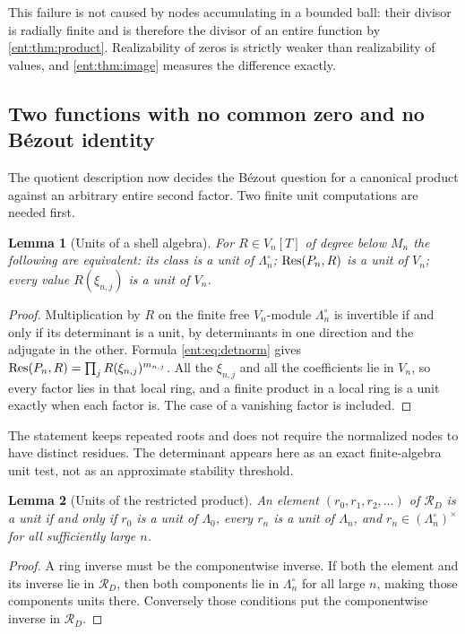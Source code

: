 \documentclass[11pt]{article}
\theoremstyle{plain}
\newtheorem{lemma}[lemma]{Lemma}
\theoremstyle{plain}
\theoremstyle{plain}
\theoremstyle{definition}
\theoremstyle{definition}
\theoremstyle{definition}
\theoremstyle{definition}
\theoremstyle{remark}
\newcommand{\RD}{\mathcal R_D}\newcommand{\Ucal}{\mathcal U}
\begin{document}
This failure is not caused by nodes accumulating in a bounded ball: their
divisor is radially finite and is therefore the divisor of an entire function
by \cref{ent:thm:product}. Realizability of zeros is strictly weaker than
realizability of values, and \cref{ent:thm:image} measures the difference
exactly.

\subsection{Two functions with no common zero and no B\'ezout identity}
\label{ent:subsec:no-bezout}
The quotient description now decides the B\'ezout question for a canonical
product against an arbitrary entire second factor. Two finite unit
computations are needed first.

\begin{lemma}[Units of a shell algebra]\label{ent:lem:shellunits}
For $R\in V_n[T]$ of degree below $M_n$ the following are equivalent:
its class is a unit of $\Lambda_n^\circ$; $\operatorname{Res}(P_n,R)$ is a unit of $V_n$;
every value $R(\xi_{n,j})$ is a unit of $V_n$.
\end{lemma}
\begin{proof}
Multiplication by $R$ on the finite free $V_n$-module $\Lambda_n^\circ$ is
invertible if and only if its determinant is a unit, by determinants in one
direction and the adjugate in the other. Formula \eqref{ent:eq:detnorm} gives
$\operatorname{Res}(P_n,R)=\prod_jR(\xi_{n,j})^{m_{n,j}}$. All the $\xi_{n,j}$ and all the
coefficients lie in $V_n$, so every factor lies in that local ring, and a
finite product in a local ring is a unit exactly when each factor is. The
case of a vanishing factor is included.
\end{proof}

The statement keeps repeated roots and does not require the normalized nodes
to have distinct residues. The determinant appears here as an exact
finite-algebra unit test, not as an approximate stability threshold.

\begin{lemma}[Units of the restricted product]\label{ent:lem:restrictedunits}
An element $(r_0,r_1,r_2,\ldots)$ of $\RD$ is a unit if and only if $r_0$ is a
unit of $\Lambda_0$, every $r_n$ is a unit of $\Lambda_n$, and
$r_n\in(\Lambda_n^\circ)^\times$ for all sufficiently large $n$.
\end{lemma}
\begin{proof}
A ring inverse must be the componentwise inverse. If both the element and its
inverse lie in $\RD$, then both components lie in $\Lambda_n^\circ$ for all
large $n$, making those components units there. Conversely those conditions
put the componentwise inverse in $\RD$.
\end{proof}
\end{document}
